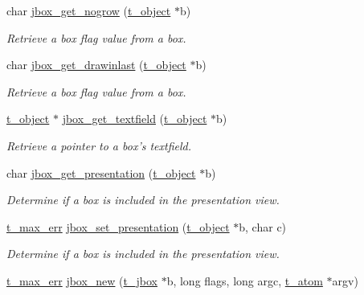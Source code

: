 \begin{DoxyCompactItemize}
char \hyperlink{group__jbox_gaae265845c184a54b16ecf19cff0f7b91}{jbox\_\-get\_\-nogrow} (\hyperlink{structt__object}{t\_\-object} $\ast$b)
\begin{DoxyCompactList}\small\item\em Retrieve a box flag value from a box. \item\end{DoxyCompactList}\item 
char \hyperlink{group__jbox_ga6e3d12a65d25b0e518ca1e246d132a7a}{jbox\_\-get\_\-drawinlast} (\hyperlink{structt__object}{t\_\-object} $\ast$b)
\begin{DoxyCompactList}\small\item\em Retrieve a box flag value from a box. \item\end{DoxyCompactList}\item 
\hyperlink{structt__object}{t\_\-object} $\ast$ \hyperlink{group__jbox_ga2f6cb01a3523876b01945baa7800e61e}{jbox\_\-get\_\-textfield} (\hyperlink{structt__object}{t\_\-object} $\ast$b)
\begin{DoxyCompactList}\small\item\em Retrieve a pointer to a box's textfield. \item\end{DoxyCompactList}\item 
char \hyperlink{group__jbox_gacbedddaaeeaf5a08a9fa6a8782b86b1f}{jbox\_\-get\_\-presentation} (\hyperlink{structt__object}{t\_\-object} $\ast$b)
\begin{DoxyCompactList}\small\item\em Determine if a box is included in the presentation view. \item\end{DoxyCompactList}\item 
\hyperlink{group__datatypes_ga73edaae82b318855cc09fac994918165}{t\_\-max\_\-err} \hyperlink{group__jbox_ga67bc0679e3f4456a6ac791fa1ebef568}{jbox\_\-set\_\-presentation} (\hyperlink{structt__object}{t\_\-object} $\ast$b, char c)
\begin{DoxyCompactList}\small\item\em Determine if a box is included in the presentation view. \item\end{DoxyCompactList}\item 
\hyperlink{group__datatypes_ga73edaae82b318855cc09fac994918165}{t\_\-max\_\-err} \hyperlink{group__jbox_gaaa460d02ca3d22c54368ade59d8e330b}{jbox\_\-new} (\hyperlink{structt__jbox}{t\_\-jbox} $\ast$b, long flags, long argc, \hyperlink{structt__atom}{t\_\-atom} $\ast$argv)

\end{DoxyCompactItemize}
